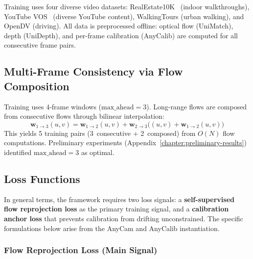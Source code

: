 Training uses four diverse video datasets: RealEstate10K~\parencite{zhou2018realestate10k} (indoor walkthroughs), YouTube VOS~\parencite{xu2018youtubevos} (diverse YouTube content), WalkingTours (urban walking), and OpenDV (driving). All data is preprocessed offline: optical flow (UniMatch), depth (UniDepth), and per-frame calibration (AnyCalib) are computed for all consecutive frame pairs.

\subsection{Multi-Frame Consistency via Flow Composition}\label{sec:flow-composition}

Training uses 4-frame windows ($\text{max\_ahead}=3$). Long-range flows are composed from consecutive flows through bilinear interpolation:
\begin{equation}
    \mathbf{w}_{1 \to 3}(u,v) = \mathbf{w}_{1 \to 2}(u,v) + \mathbf{w}_{2 \to 3}\bigl((u,v) + \mathbf{w}_{1 \to 2}(u,v)\bigr)
\end{equation}
This yields 5 training pairs (3~consecutive + 2~composed) from $O(N)$ flow computations. Preliminary experiments (Appendix~\ref{chapter:preliminary-results}) identified $\text{max\_ahead}=3$ as optimal.

\subsection{Loss Functions}\label{sec:losses}

In general terms, the framework requires two loss signals: a \textbf{self-supervised flow reprojection loss} as the primary training signal, and a \textbf{calibration anchor loss} that prevents calibration from drifting unconstrained. The specific formulations below arise from the AnyCam and AnyCalib instantiation.

\subsubsection{Flow Reprojection Loss (Main Signal)}


